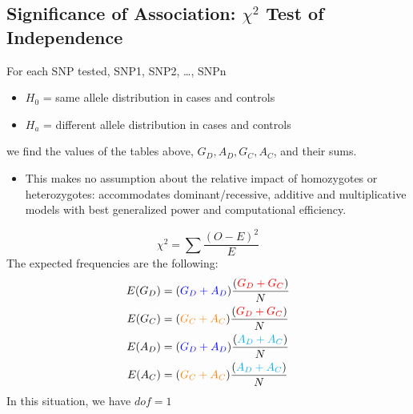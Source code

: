 \documentclass[10pt]{article}
\begin{document}
\subsection*{Significance of Association: $\chi^2$ Test of Independence}
For each SNP tested, SNP1, SNP2, \dots, SNPn
\begin{itemize}
	\item $H_0$ = same allele distribution in cases and controls
	\item $H_a$ = different allele distribution in cases and controls
\end{itemize}
we find the values of the tables above, $G_D, A_D, G_C, A_C$, and their sums.
\begin{itemize}
	\item This makes no assumption about the relative impact of homozygotes or heterozygotes: accommodates dominant/recessive, additive and multiplicative models with best generalized power and computational efficiency.
\end{itemize}
\[\chi^2 = \sum \frac{(O - E)^2}{E}\]
The expected frequencies are the following:
\begin{align*}
    E(G_D) &= (\textcolor{blue}{G_D + A_D}) \frac{(\textcolor{red}{G_D + G_C})}{N} \\
    E(G_C) &= (\textcolor{orange}{G_C + A_C}) \frac{(\textcolor{red}{G_D + G_C})}{N} \\
    E(A_D) &= (\textcolor{blue}{G_D + A_D}) \frac{(\textcolor{cyan}{A_D + A_C})}{N} \\
    E(A_C) &= (\textcolor{orange}{G_C + A_C}) \frac{(\textcolor{cyan}{A_D + A_C})}{N}
\end{align*}
In this situation, we have $dof = 1$
\end{document}
